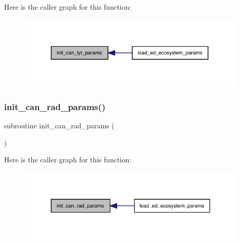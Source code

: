 Here is the caller graph for this function\+:
\nopagebreak
\begin{figure}[H]
\begin{center}
\leavevmode
\includegraphics[width=312pt]{ed__params_8f90_a8006ef395d1da1e27d9cd7a2092b7505_icgraph}
\end{center}
\end{figure}
\mbox{\label{ed__params_8f90_ab8f34fc4864d52e9d15f2825fd5d42b2}} 
\subsubsection{\texorpdfstring{init\+\_\+can\+\_\+rad\+\_\+params()}{init\_can\_rad\_params()}}
{\footnotesize\ttfamily subroutine init\+\_\+can\+\_\+rad\+\_\+params (\begin{DoxyParamCaption}{ }\end{DoxyParamCaption})}

Here is the caller graph for this function\+:
\nopagebreak
\begin{figure}[H]
\begin{center}
\leavevmode
\includegraphics[width=315pt]{ed__params_8f90_ab8f34fc4864d52e9d15f2825fd5d42b2_icgraph}
\end{center}
\end{figure}
\mbox{\label{ed__params_8f90_a2caf4cbc69ad3b7681fef571ba0d787b}} 
